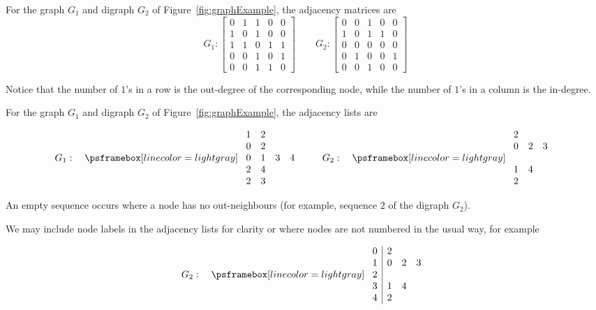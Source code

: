 \begin{Example}
For the graph $G_1$ and digraph $G_2$ of Figure~\ref{fig:graphExample}, 
the adjacency matrices are
$$
G_1: 
\left[
\begin{matrix}
0 & 1 & 1 & 0 & 0 \\
1 & 0 & 1 & 0 & 0 \\
1 & 1 & 0 & 1 & 1 \\
0 & 0 & 1 & 0 & 1 \\
0 & 0 & 1 & 1 & 0 
\end{matrix}
\right]
\qquad 
G_2: 
\left[
\begin{matrix}
0 & 0 & 1 & 0 & 0 \\
1 & 0 & 1 & 1 & 0 \\
0 & 0 & 0 & 0 & 0 \\
0 & 1 & 0 & 0 & 1 \\
0 & 0 & 1 & 0 & 0 
\end{matrix}
\right]
$$

Notice that the number of $1$'s in a row is the out-degree
 of the corresponding node, while the number of $1$'s in a column is the in-degree.
 \end{Example}
 
 \begin{Example}
For the graph $G_1$ and digraph $G_2$ of Figure~\ref{fig:graphExample}, 
the adjacency lists 
are
\begin{center}
$$
G_1: \quad
\AdjLists{
\begin{array}{cccc}
1 & 2  \\
0 & 2 \\
0 & 1 & 3 & 4  \\
2 & 4  \\
2 & 3  \\
\end{array}
}
 \qquad
G_2: 
\quad 
\AdjLists{
\begin{array}{ccc}
2  \\
0 & 2 & 3  \\
\\
1 & 4  \\
2 \\
\end{array}
}
$$
\end{center}

An empty sequence occurs where a node has no out-neighbours (for example, sequence $2$ of the digraph $G_2$). 

We may include node labels in the adjacency lists for clarity or where nodes are not numbered in the usual way, for example

$$
G_2: 
\quad 
\AdjLists{
\begin{array}{c|ccc}
0 & 2  \\
1 & 0 & 2 & 3  \\
2  \\
3 & 1 & 4  \\
4& 2 \\
\end{array}
}
$$

\end{Example}


